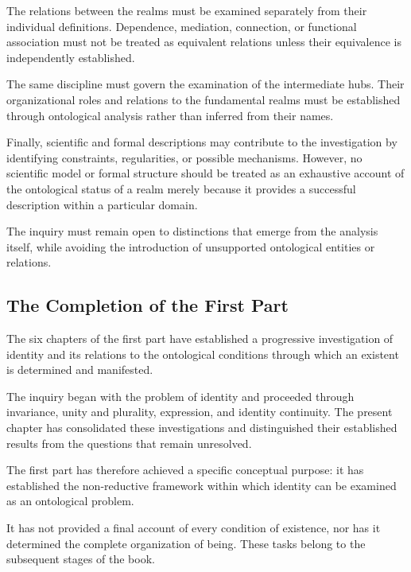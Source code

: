 The relations between the realms must be examined
separately from their individual definitions.
Dependence, mediation, connection, or functional
association must not be treated as equivalent
relations unless their equivalence is independently
established.

The same discipline must govern the examination
of the intermediate hubs. Their organizational
roles and relations to the fundamental realms
must be established through ontological analysis
rather than inferred from their names.

Finally, scientific and formal descriptions may
contribute to the investigation by identifying
constraints, regularities, or possible mechanisms.
However, no scientific model or formal structure
should be treated as an exhaustive account of
the ontological status of a realm merely because
it provides a successful description within a
particular domain.

The inquiry must remain open to distinctions
that emerge from the analysis itself, while
avoiding the introduction of unsupported
ontological entities or relations.


\subsection{The Completion of the First Part}

The six chapters of the first part have established
a progressive investigation of identity and its
relations to the ontological conditions through
which an existent is determined and manifested.

The inquiry began with the problem of identity
and proceeded through invariance, unity and
plurality, expression, and identity continuity.
The present chapter has consolidated these
investigations and distinguished their established
results from the questions that remain unresolved.

The first part has therefore achieved a specific
conceptual purpose: it has established the
non-reductive framework within which identity
can be examined as an ontological problem.

It has not provided a final account of every
condition of existence, nor has it determined
the complete organization of being. These tasks
belong to the subsequent stages of the book.

